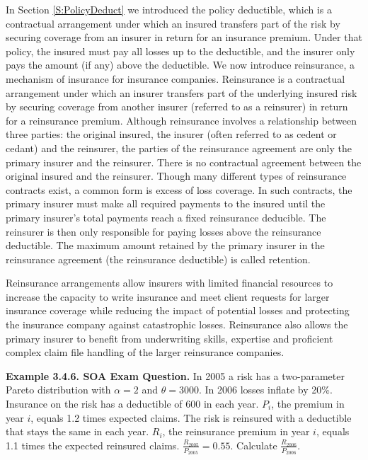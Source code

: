 \documentclass[]{book}
\theoremstyle{definition}
\theoremstyle{definition}
\theoremstyle{definition}
\theoremstyle{remark}
\begin{document}
In Section \ref{S:PolicyDeduct} we introduced the policy deductible,
which is a contractual arrangement under which an insured transfers part
of the risk by securing coverage from an insurer in return for an
insurance premium. Under that policy, the insured must pay all losses up
to the deductible, and the insurer only pays the amount (if any) above
the deductible. We now introduce reinsurance, a mechanism of insurance
for insurance companies. Reinsurance is a contractual arrangement under
which an insurer transfers part of the underlying insured risk by
securing coverage from another insurer (referred to as a reinsurer) in
return for a reinsurance premium. Although reinsurance involves a
relationship between three parties: the original insured, the insurer
(often referred to as cedent or cedant) and the reinsurer, the parties
of the reinsurance agreement are only the primary insurer and the
reinsurer. There is no contractual agreement between the original
insured and the reinsurer. Though many different types of reinsurance
contracts exist, a common form is excess of loss coverage. In such
contracts, the primary insurer must make all required payments to the
insured until the primary insurer's total payments reach a fixed
reinsurance deducible. The reinsurer is then only responsible for paying
losses above the reinsurance deductible. The maximum amount retained by
the primary insurer in the reinsurance agreement (the reinsurance
deductible) is called retention.

Reinsurance arrangements allow insurers with limited financial resources
to increase the capacity to write insurance and meet client requests for
larger insurance coverage while reducing the impact of potential losses
and protecting the insurance company against catastrophic losses.
Reinsurance also allows the primary insurer to benefit from underwriting
skills, expertise and proficient complex claim file handling of the
larger reinsurance companies.

\textbf{Example 3.4.6. SOA Exam Question.} In 2005 a risk has a
two-parameter Pareto distribution with \(\alpha = 2\) and
\(\theta = 3000\). In 2006 losses inflate by 20\%. Insurance on the risk
has a deductible of 600 in each year. \(P_{i}\), the premium in year
\(i\), equals 1.2 times expected claims. The risk is reinsured with a
deductible that stays the same in each year. \(R_{i}\), the reinsurance
premium in year \(i\), equals 1.1 times the expected reinsured claims.
\(\frac{R_{2005}}{P_{2005}} = 0.55\). Calculate
\(\frac{R_{2006}}{P_{2006}}\).
\end{document}
